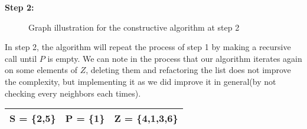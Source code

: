\vspace{1\baselineskip}

\begin{minipage}{\linewidth}
    \textbf{Step 2:}

    \begin{minipage}{0.4\textwidth}
        \begin{figure}[H]
            \centering
            \caption{Graph illustration for the constructive algorithm at step 2}
            \label{fig:constructive-mewc-edge-step2}
        \end{figure}
    \end{minipage}
    \hspace{0.04\linewidth}
    \begin{minipage}{0.55\textwidth}
        In step 2, the algorithm will repeat the process of step 1 by making a recursive call until $P$ is empty. We can note in the process that our algorithm iterates again on some elements of $Z$, deleting them and refactoring the list does not improve the complexity, but implementing it as we did improve it in general(by not checking every neighbors each times).

        \begin{center}
            \begin{tabular}{|lll|}
                \hline
                S = \{2,5\} & P = \{1\} & Z = \{4,1,3,6\} \\
                \hline
            \end{tabular}
        \end{center}
    \end{minipage}
\end{minipage}

